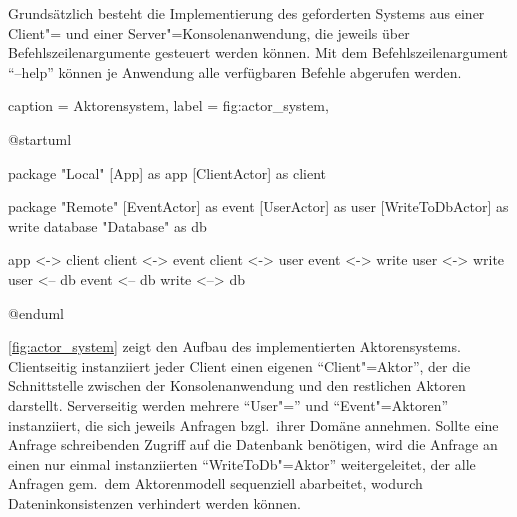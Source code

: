 Grundsätzlich besteht die Implementierung des geforderten Systems aus einer Client"= und einer Server"=Konsolenanwendung, die jeweils über Befehlszeilenargumente gesteuert werden können.
Mit dem Befehlszeilenargument \enquote{--help} können je Anwendung alle verfügbaren Befehle abgerufen werden.

\begin{dhbwfigure}{%
    caption	= Aktorensystem,
    label	= fig:actor_system,
}
\begin{plantuml}
@startuml

package "Local" {
    [App] as app
    [ClientActor] as client
}

package "Remote" {
    [EventActor] as event
    [UserActor] as user
    [WriteToDbActor] as write
    database "Database" as db
}

app <-> client
client <-> event
client <-> user
event <-> write
user <-> write
user <-- db
event <-- db
write <--> db

@enduml
\end{plantuml}
\end{dhbwfigure}

\autoref{fig:actor_system} zeigt den Aufbau des implementierten Aktorensystems.
Clientseitig instanziiert jeder Client einen eigenen \enquote{Client"=Aktor}, der die Schnittstelle zwischen der Konsolenanwendung und den restlichen Aktoren darstellt.
Serverseitig werden mehrere \enquote{User"=} und \enquote{Event"=Aktoren} instanziiert, die sich jeweils Anfragen bzgl.\ ihrer Domäne annehmen.
Sollte eine Anfrage schreibenden Zugriff auf die Datenbank benötigen, wird die Anfrage an einen nur einmal instanziierten \enquote{WriteToDb"=Aktor} weitergeleitet, der alle Anfragen gem.\ dem Aktorenmodell sequenziell abarbeitet, wodurch Dateninkonsistenzen verhindert werden können.
